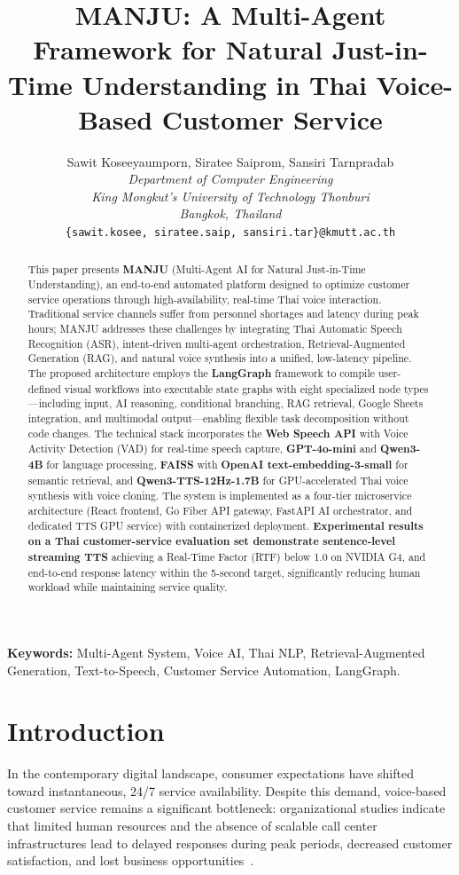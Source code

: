 \documentclass[10pt, a4paper, twocolumn]{article}
\title{\textbf{MANJU: A Multi-Agent Framework for Natural Just-in-Time Understanding in Thai Voice-Based Customer Service}}
\author{
    Sawit Koseeyaumporn, Siratee Saiprom, Sansiri Tarnpradab \\
    \textit{Department of Computer Engineering} \\
    \textit{King Mongkut's University of Technology Thonburi} \\
    \textit{Bangkok, Thailand} \\
    \texttt{\{sawit.kosee, siratee.saip, sansiri.tar\}@kmutt.ac.th}
}
\date{}
\begin{document}
\maketitle

\begin{abstract}
This paper presents \textbf{MANJU} (Multi-Agent AI for Natural Just-in-Time Understanding), an end-to-end automated platform designed to optimize customer service operations through high-availability, real-time Thai voice interaction.
Traditional service channels suffer from personnel shortages and latency during peak hours; MANJU addresses these challenges by integrating Thai Automatic Speech Recognition (ASR), intent-driven multi-agent orchestration, Retrieval-Augmented Generation (RAG), and natural voice synthesis into a unified, low-latency pipeline.
The proposed architecture employs the \textbf{LangGraph} framework to compile user-defined visual workflows into executable state graphs with eight specialized node types---including input, AI reasoning, conditional branching, RAG retrieval, Google Sheets integration, and multimodal output---enabling flexible task decomposition without code changes.
The technical stack incorporates the \textbf{Web Speech API} with Voice Activity Detection (VAD) for real-time speech capture, \textbf{GPT-4o-mini} and \textbf{Qwen3-4B} for language processing, \textbf{FAISS} with \textbf{OpenAI text-embedding-3-small} for semantic retrieval, and \textbf{Qwen3-TTS-12Hz-1.7B} for GPU-accelerated Thai voice synthesis with voice cloning.
The system is implemented as a four-tier microservice architecture (React frontend, Go Fiber API gateway, FastAPI AI orchestrator, and dedicated TTS GPU service) with containerized deployment.
\textbf{Experimental results on a Thai customer-service evaluation set demonstrate sentence-level streaming TTS} achieving a Real-Time Factor (RTF) below 1.0 on NVIDIA G4, and end-to-end response latency within the 5-second target, significantly reducing human workload while maintaining service quality.
\end{abstract}

\vspace{0.5em}
\noindent \textbf{Keywords:} Multi-Agent System, Voice AI, Thai NLP, Retrieval-Augmented Generation, Text-to-Speech, Customer Service Automation, LangGraph.

\section{Introduction}
In the contemporary digital landscape, consumer expectations have shifted toward instantaneous, 24/7 service availability.
Despite this demand, voice-based customer service remains a significant bottleneck: organizational studies indicate that limited human resources and the absence of scalable call center infrastructures lead to delayed responses during peak periods, decreased customer satisfaction, and lost business opportunities~\cite{gans2003callcenters}.
\end{document}
